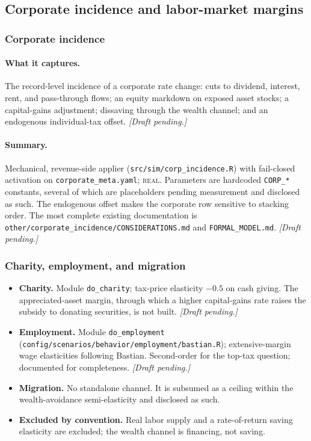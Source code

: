 \documentclass[11pt]{article}
\newcommand{\code}[1]{\texttt{\small #1}}
\newcommand{\pending}{\textit{[Draft pending.]}}
\newcommand{\field}[1]{\paragraph{#1.}}
\begin{document}
\subsection{Corporate incidence and labor-market margins}

\subsubsection{Corporate incidence}
\label{sec:corp}

\field{What it captures}
The record-level incidence of a corporate rate change: cuts to dividend,
interest, rent, and pass-through flows; an equity markdown on exposed asset
stocks; a capital-gains adjustment; dissaving through the wealth channel; and an
endogenous individual-tax offset. \pending

\field{Summary}
Mechanical, revenue-side applier (\code{src/sim/corp_incidence.R}) with
fail-closed activation on \code{corporate_meta.yaml}; \textsc{real}. Parameters
are hardcoded \code{CORP_*} constants, several of which are placeholders pending
measurement and disclosed as such. The endogenous offset makes the corporate row
sensitive to stacking order. The most complete existing documentation is
\code{other/corporate_incidence/CONSIDERATIONS.md} and \code{FORMAL_MODEL.md}.
\pending

\subsubsection{Charity, employment, and migration}
\label{sec:other}

\begin{itemize}[leftmargin=1.4em]
\item \textbf{Charity.} Module \code{do_charity}; tax-price elasticity $-0.5$ on
cash giving. The appreciated-asset margin, through which a higher capital-gains
rate raises the subsidy to donating securities, is not built. \pending
\item \textbf{Employment.} Module \code{do_employment}
(\code{config/scenarios/behavior/employment/bastian.R}); extensive-margin wage
elasticities following Bastian. Second-order for the top-tax question; documented
for completeness. \pending
\item \textbf{Migration.} No standalone channel. It is subsumed as a ceiling
within the wealth-avoidance semi-elasticity and disclosed as such.
\item \textbf{Excluded by convention.} Real labor supply and a rate-of-return
saving elasticity are excluded; the wealth channel is financing, not saving.
\end{itemize}
\end{document}
